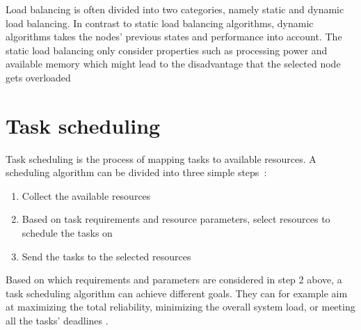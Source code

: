 \documentclass{cslthse-msc}
\begin{document}
Load balancing is often divided into two categories, namely static and dynamic load balancing. In contrast to static load balancing algorithms, dynamic algorithms takes the nodes' previous states and performance into account. The static load balancing only consider properties such as processing power and available memory which might lead to the disadvantage that the selected node gets overloaded~\cite{perfAnalysisLoadCloud}

\section{Task scheduling} \label{sec:background_task_sched}
Task scheduling is the process of mapping tasks to available resources. A scheduling algorithm can be divided into three simple steps~\cite{optSchedCloud}:

\begin{enumerate}
	\item Collect the available resources
	\item Based on task requirements and resource parameters, select resources to schedule the tasks on
	\item Send the tasks to the selected resources
\end{enumerate}

Based on which requirements and parameters are considered in step 2 above, a task scheduling algorithm can achieve different goals. They can for example aim at maximizing the total reliability, minimizing the overall system load, or meeting all the tasks' deadlines \cite{schedulingSurvey}. 
\end{document}
